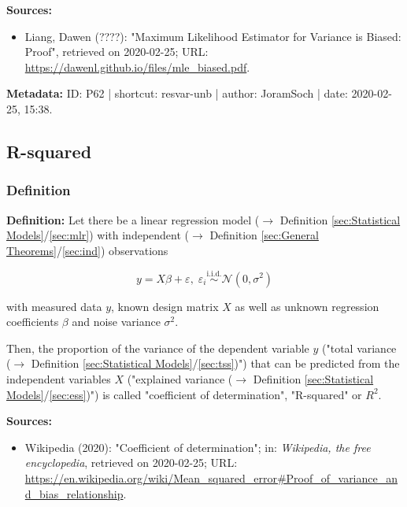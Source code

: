 \documentclass[a4paper,12pt,twoside]{book}
\begin{document}
\vspace{1em}
\textbf{Sources:}
\begin{itemize}
\item Liang, Dawen (????): "Maximum Likelihood Estimator for Variance is Biased: Proof", retrieved on 2020-02-25; URL: \url{https://dawenl.github.io/files/mle_biased.pdf}.
\end{itemize}


\vspace{1em}
\textbf{Metadata:} ID: P62 | shortcut: resvar-unb | author: JoramSoch | date: 2020-02-25, 15:38.
\vspace{1em}



\subsection{R-squared}

\subsubsection[\textit{Definition}]{Definition} \label{sec:rsq}
\setcounter{equation}{0}

\textbf{Definition:} Let there be a linear regression model ($\rightarrow$ Definition \ref{sec:Statistical Models}/\ref{sec:mlr}) with independent ($\rightarrow$ Definition \ref{sec:General Theorems}/\ref{sec:ind}) observations

\begin{equation} \label{eq:rsq-mlr}
y = X\beta + \varepsilon, \; \varepsilon_i \overset{\mathrm{i.i.d.}}{\sim} \mathcal{N}(0, \sigma^2)
\end{equation}

with measured data $y$, known design matrix $X$ as well as unknown regression coefficients $\beta$ and noise variance $\sigma^2$.

Then, the proportion of the variance of the dependent variable $y$ ("total variance ($\rightarrow$ Definition \ref{sec:Statistical Models}/\ref{sec:tss})") that can be predicted from the independent variables $X$ ("explained variance ($\rightarrow$ Definition \ref{sec:Statistical Models}/\ref{sec:ess})") is called "coefficient of determination", "R-squared" or $R^2$.


\vspace{1em}
\textbf{Sources:}
\begin{itemize}
\item Wikipedia (2020): "Coefficient of determination"; in: \textit{Wikipedia, the free encyclopedia}, retrieved on 2020-02-25; URL: \url{https://en.wikipedia.org/wiki/Mean_squared_error#Proof_of_variance_and_bias_relationship}.
\end{itemize}
\end{document}
